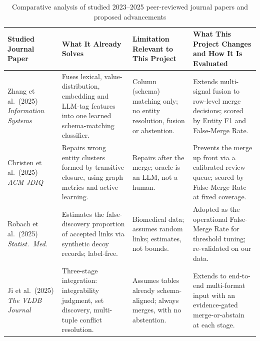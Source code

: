 \documentclass[12pt,a4paper]{article}
\renewcommand{\arraystretch}{1.08}
\begin{document}
\begin{table}[htbp]
\centering
\caption{Comparative analysis of studied 2023--2025 peer-reviewed journal papers and proposed advancements}
\label{tab:existing_methods}

\footnotesize
\renewcommand{\arraystretch}{1.25}
\setlength{\tabcolsep}{4pt}

\begin{tabularx}{\textwidth}{
    @{}
    >{\RaggedRight\arraybackslash}p{}
    >{\RaggedRight\arraybackslash}p{}
    >{\RaggedRight\arraybackslash}p{}
    >{\RaggedRight\arraybackslash}X
    @{}
}
\toprule

\textbf{Studied Journal Paper}
&
\textbf{What It Already Solves}
&
\textbf{Limitation Relevant to This Project}
&
\textbf{What This Project Changes and How It Is Evaluated}
\\

\midrule

Zhang et al.\ (2025) \cite{smutf2025} \newline
\textit{Information Systems}
&
Fuses lexical, value-distribution, embedding and LLM-tag features into one learned schema-matching classifier.
&
Column (schema) matching only; no entity resolution, fusion or abstention.
&
Extends multi-signal fusion to row-level merge decisions; scored by Entity F1 and False-Merge Rate.
\\[4pt]

Christen et al.\ (2025) \cite{christen2025cluster} \newline
\textit{ACM JDIQ}
&
Repairs wrong entity clusters formed by transitive closure, using graph metrics and active learning.
&
Repairs after the merge; oracle is an LLM, not a human.
&
Prevents the merge up front via a calibrated review queue; scored by False-Merge Rate at fixed coverage.
\\[4pt]

Robach et al.\ (2025) \cite{robach2025falsediscovery} \newline
\textit{Statist.\ Med.}
&
Estimates the false-discovery proportion of accepted links via synthetic decoy records; label-free.
&
Biomedical data; assumes random links; estimates, not bounds.
&
Adopted as the operational False-Merge Rate for threshold tuning; re-validated on our data.
\\[4pt]

Ji et al.\ (2025) \cite{ji2025tableintegration} \newline
\textit{The VLDB Journal}
&
Three-stage integration: integrability judgment, set discovery, multi-tuple conflict resolution.
&
Assumes tables already schema-aligned; always merges, with no abstention.
&
Extends to end-to-end multi-format input with an evidence-gated merge-or-abstain at each stage.
\\[4pt]


\end{tabularx}
\end{table}
\end{document}
